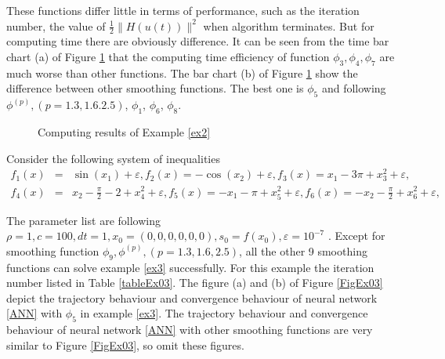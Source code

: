 \documentclass[12pt]{article}
\begin{document}
 These functions differ little in terms of performance, such as the iteration
 number, the value of $\frac{1}{2}\|H(u(t))\|^2$ when  algorithm terminates.
 But for computing time there are obviously difference. It can be seen from
 the time bar chart (a) of Figure \ref{FigEx02} that the computing time
 efficiency of function $\phi_3,\phi_4,\phi_7$ are much worse than other
 functions. The bar chart (b) of Figure  \ref{FigEx02} show the
 difference between other smoothing functions. The best one is $\phi_5$
 and following $\phi^{(p)},(p=1.3,1.6.2.5)$, $\phi_1$, $\phi_6$, $\phi_8$.

\begin{figure}[ht]
\centering
{}
\caption{Computing results of Example \ref{ex2}}\label{FigEx02}
\end{figure}



 \begin{example}\label{ex3}
 Consider the following system of inequalities
 \begin{eqnarray*}
 f_1(x) &=&\sin(x_1)+ \varepsilon, f_2(x) = -\cos(x_2)+ \varepsilon,
 f_3(x) = x_1 - 3\pi+x_3^2 + \varepsilon,\\
 f_4(x) &=&x_2 - \frac{\pi}{2} -2+x_4^2 + \varepsilon,
 f_5(x) = -x_1 - \pi + x_5^2 + \varepsilon,
 f_6(x) = -x_2 - \frac{\pi}{2} + x_6^2 + \varepsilon,
 \end{eqnarray*}
 \end{example}



 The parameter list are following $\rho = 1, c=100, dt=1, x_0 = (0,0,0,0,0,0),
  s_0 = f(x_0),\varepsilon = 10^{-7} $ .
 Except for smoothing function $\phi_9,\phi^{(p)},(p=1.3,1.6,2.5)$, all the
 other 9 smoothing functions can solve  example \ref{ex3} successfully. For
 this example the iteration number listed in Table \ref{tableEx03}. The figure
 (a) and (b) of Figure  \ref{FigEx03} depict the trajectory behaviour and convergence behaviour
 of neural network \eqref{ANN} with $\phi_5$ in example \ref{ex3}. The trajectory
 behaviour and convergence behaviour  of neural network \eqref{ANN} with other
 smoothing functions are very similar to Figure \ref{FigEx03},  so omit
 these figures.
\end{document}

